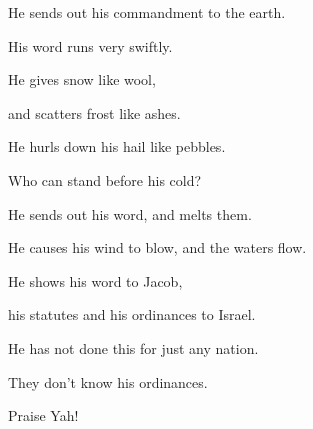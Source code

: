 {\par }{\Q {}He sends out his commandment to the earth.
\par }{\QB His word runs very swiftly.
\par }{\Q {}He gives snow like wool,
\par }{\QB and scatters frost like ashes.
\par }{\Q {}He hurls down his hail like pebbles.
\par }{\QB Who can stand before his cold?
\par }{\Q {}He sends out his word, and melts them.
\par }{\QB He causes his wind to blow, and the waters flow.
\par }{\Q {}He shows his word to Jacob,
\par }{\QB his statutes and his ordinances to Israel.
\par }{\Q {}He has not done this for just any nation.
\par }{\QB They don’t know his ordinances.
\par }{\Q Praise Yah!
\par }{\BB \par }
